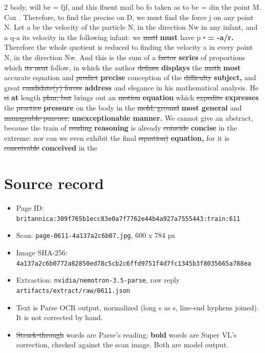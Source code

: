 \documentclass[10pt]{article}
\begin{document}
\begin{multicols}{2}
body, will be = fjf, and this fluent mail bo fo taken as to be = din the point M. Cox . Therefore, to find the precise on D, we must find the force j on any point N. Let a be the velocity of the particle N, in the direction Nw in any infant, and a q-a its velocity in the following infant: we \sout{mutl} \textbf{must} have p \sout{-} \textbf{= -a/r.} Therefore the whole quotient is reduced to finding the velocity a in every point N, in the direction Nw. And this is the sum of a \sout{factor} \textbf{series} of proportions which \sout{its neat} follow, in which the author \sout{defines} \textbf{displays} the \sout{math} \textbf{most} accurate equation and \sout{predict} \textbf{precise} conception of the \sout{difficulty} \textbf{subject,} and great \sout{candidate(y) forces} \textbf{address} and elegance in his mathematical analysis. He \sout{si} \textbf{at} length \sout{plan, but} brings out an \sout{motion} \textbf{equation} which \sout{expedite} \textbf{expresses} the \sout{practice} \textbf{pressure} on the body in the \sout{mold, ground} \textbf{most general} and \sout{manageable pun-ner.} \textbf{unexceptionable manner.} We cannot give an abstract, because the train of \sout{reading} \textbf{reasoning} is already \sout{coincide} \textbf{concise} in the extreme: nor can we even exhibit the final \sout{equation)} \textbf{equation,} for it is \sout{conceivable} \textbf{conceived} in the
\end{multicols}
\section*{Source record}
\begin{itemize}
\item Page ID: \texttt{britannica:309f765b1ecc83e0a7f7762e44b4a927a7555443:train:611}
\item Scan: \texttt{page-0611-4a137a2c6b07.jpg}, 600 x 784 px
\item Image SHA-256: \texttt{\small 4a137a2c6b0772a82850ed78c5cb2c6ffd9751f4d7fc1345b3f8035665a788ea}
\item Extraction: \texttt{nvidia/nemotron-3.5-parse}, raw reply \texttt{artifacts/extract/raw/0611.json}
\item Text is Parse OCR output, normalized (long s as s, line-end hyphens joined). It is not corrected by hand.
\item \sout{Struck-through} words are Parse's reading; \textbf{bold} words are Super VL's correction, checked against the scan image. Both are model output.
\end{itemize}
\end{document}
